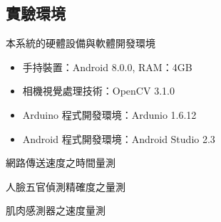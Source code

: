 \documentclass[12pt]{article}  %
\theoremstyle{plain}
\begin{document}
\subsection{實驗環境}
本系統的硬體設備與軟體開發環境
\begin{itemize}
\item 手持裝置：Android 8.0.0, RAM：4GB
\item 相機視覺處理技術：OpenCV 3.1.0
\item Arduino 程式開發環境：Ardunio 1.6.12
\item Android 程式開發環境：Android Studio 2.3
\end{itemize}

網路傳送速度之時間量測

人臉五官偵測精確度之量測

肌肉感測器之速度量測
\end{document}
